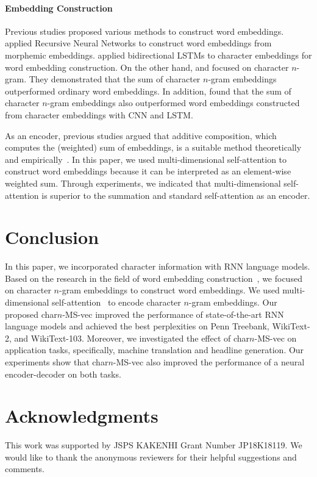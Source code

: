 \documentclass[letterpaper]{article} %
\begin{document}
\paragraph{Embedding Construction}
Previous studies proposed various methods to construct word embeddings.
\cite{luong-socher-manning:2013:CoNLL-2013} applied Recursive Neural Networks to construct word embeddings from morphemic embeddings.
\cite{ling-EtAl:2015:EMNLP2} applied bidirectional LSTMs to character embeddings for word embedding construction.
On the other hand, \cite{TACL999} and \cite{wieting-EtAl:2016:EMNLP2016} focused on character $n$-gram.
They demonstrated that the sum of character $n$-gram embeddings outperformed ordinary word embeddings.
In addition, \cite{wieting-EtAl:2016:EMNLP2016} found that the sum of character $n$-gram embeddings also outperformed word embeddings constructed from character embeddings with CNN and LSTM.


As an encoder, previous studies argued that additive composition, which computes the (weighted) sum of embeddings, is a suitable method theoretically~\cite{rantian:additive} and empirically~\cite{Muraoka-EtAl:2014:PACLIC,takase-okazaki-inui:2016:P16-1}.
In this paper, we used multi-dimensional self-attention to construct word embeddings because it can be interpreted as an element-wise weighted sum.
Through experiments, we indicated that multi-dimensional self-attention is superior to the summation and standard self-attention as an encoder.



\section{Conclusion}
In this paper, we incorporated character information with RNN language models.
Based on the research in the field of word embedding construction~\cite{wieting-EtAl:2016:EMNLP2016}, we focused on character $n$-gram embeddings to construct word embeddings.
We used multi-dimensional self-attention~\cite{shen2018disan} to encode character $n$-gram embeddings.
Our proposed char$n$-MS-vec improved the performance of state-of-the-art RNN language models and achieved the best perplexities on Penn Treebank, WikiText-2, and WikiText-103.
Moreover, we investigated the effect of char$n$-MS-vec on application tasks, specifically, machine translation and headline generation.
Our experiments show that char$n$-MS-vec also improved the performance of a neural encoder-decoder on both tasks.

\section*{Acknowledgments}
This work was supported by JSPS KAKENHI Grant Number JP18K18119.
We would like to thank the anonymous reviewers for their helpful suggestions and comments.
\end{document}
